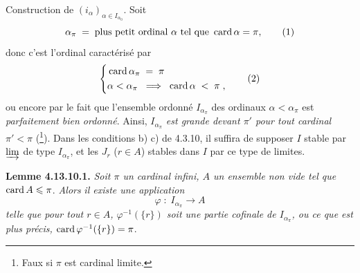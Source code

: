 Construction de $(i_\alpha)_{\alpha\in I_{\alpha_0}}$. Soit %
\[ \alpha_\pi \; = \; \text{plus petit ordinal } \alpha \text{ tel que } \card\alpha=\pi, \tag*{(1)} \]
donc c'est l'ordinal caractérisé par
\[ \left\{
\begin{aligned}
&\card\alpha_\pi \; = \; \pi \\
&\alpha<\alpha_\pi \;\; \Longrightarrow \;\; \card\alpha \; < \; \pi \; ,
\end{aligned}
\right. \tag*{(2)} \]
ou encore par le fait que l'ensemble ordonné $I_{\alpha_\pi}$ des ordinaux $\alpha<\alpha_\pi$ est \textit{parfaitement bien ordonné}. Ainsi, $I_{\alpha_\pi}$ \textit{est grande devant $\pi'$ pour tout cardinal $\pi'<\pi$} (\footnote[130]{Faux si $\pi$ est cardinal limite.}). Dans les conditions b) c) de 4.3.10, il suffira de supposer $I$ stable par $\varinjlim$ de type $I_{\alpha_\pi}$, et les $J_r$ ($r\in A$) stables dans $I$ par ce type de limites. %

\textbf{Lemme 4.13.10.1.} \textit{Soit $\pi$ un cardinal infini, $A$ un ensemble non vide tel que} $\operatorname{card} A\leqslant\pi$. \textit{Alors}
\textit{il existe une application}
\[ \varphi \; : \; I_{\alpha_\pi} \longrightarrow A \]
\textit{telle que pour tout $r\in A$, $\varphi^{-1}(\{r\})$ soit une partie cofinale de $I_{\alpha_\pi}$, ou ce que est plus précis,} $\operatorname{card}\varphi^{-1}(\{r\})=\pi$. %

